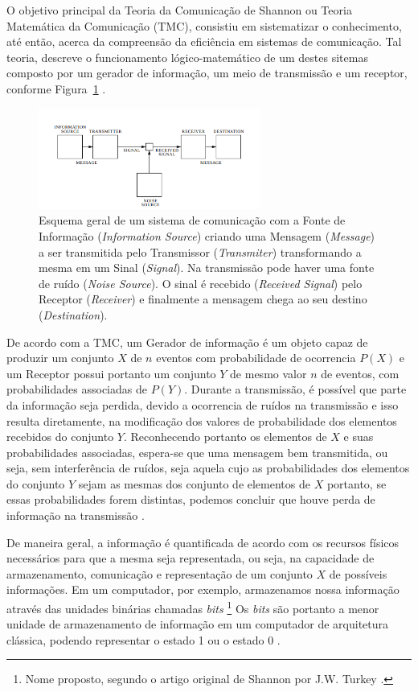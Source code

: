 \documentclass[11pt,oneside,brazil,hidelinks,article,sumario=tradicional,a4paper]{abntex2}
\begin{document}
O objetivo principal da Teoria da Comunicação de Shannon ou Teoria Matemática da Comunicação (TMC), consistiu em sistematizar o conhecimento, até então, acerca da compreensão da eficiência em sistemas de comunicação. Tal teoria, descreve o funcionamento lógico-matemático de um destes sitemas composto por um gerador de informação, um meio de transmissão e um receptor, conforme Figura~\ref{comunicshannon} \cite{MTC}.

\begin{figure}[ht!]
 \centering
 \caption{Esquema geral de um sistema de comunicação com a Fonte de Informação (\textit{Information Source}) criando uma Mensagem (\textit{Message}) a ser transmitida pelo Transmissor (\textit{Transmiter}) transformando a mesma em um Sinal (\textit{Signal}). Na transmissão pode haver uma fonte de ruído (\textit{Noise Source}). O sinal é recebido (\textit{Received Signal}) pelo Receptor (\textit{Receiver}) e finalmente a mensagem chega ao seu destino (\textit{Destination}).}\label{comunicshannon}
\includegraphics[width=0.65\textwidth]{comunicadorshannon.png}  
\end{figure}

De acordo com  a TMC, um Gerador de informação é um objeto capaz de produzir um conjunto $X$ de $n$ eventos com probabilidade de ocorrencia $P(X)$ e um Receptor possui portanto um conjunto $Y$ de mesmo valor $n$ de eventos, com probabilidades associadas de $P(Y)$. Durante a transmissão, é possível que parte da informação seja perdida, devido a ocorrencia de ruídos na transmissão e isso resulta diretamente, na modificação dos valores de probabilidade dos elementos recebidos do conjunto $Y$. Reconhecendo portanto os elementos de $X$ e suas probabilidades associadas, espera-se que uma mensagem bem transmitida, ou seja, sem interferência de ruídos, seja aquela cujo as probabilidades dos elementos do conjunto $Y$ sejam as mesmas dos conjunto de elementos de $X$ portanto, se essas probabilidades forem distintas, podemos concluir que houve perda de informação na transmissão \cite{mathematical}.

De maneira geral, a informação é quantificada de acordo com os recursos físicos necessários para que a mesma seja representada, ou seja, na capacidade de armazenamento, comunicação e representação de um conjunto $X$ de possíveis informações. Em um computador, por exemplo, armazenamos nossa informação através das unidades binárias chamadas \textit{bits} \footnote{Nome proposto, segundo o artigo original de Shannon por J.W. Turkey \cite{MTC}.} Os \textit{bits} são portanto a menor unidade de armazenamento de informação em um computador de arquitetura clássica, podendo representar o estado 1 ou o estado 0 \cite{MTC}.
\end{document}
